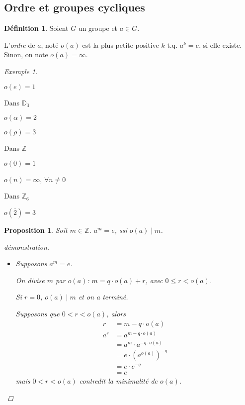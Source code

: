 \documentclass{report}
\newcommand*{\entiers}{\mathbb{Z}}
\newtheorem*{prop}{Proposition}
\theoremstyle{definition}
\newtheorem*{defin}{D\'efinition}
\theoremstyle{remark}
\newtheorem*{exem}{Exemple}
\begin{document}
	\subsection{Ordre et groupes cycliques}
	\begin{defin}
		Soient $G$ un groupe et $a \in G$.

		L'\emph{ordre} de $a$, not\'e $o(a)$ est la plus petite positive $k$ t.q. $a^k=e$, si elle existe. Sinon, on note $o(a) = \infty$.
	\end{defin}
	\begin{exem}~

		\begin{ulist}
			\item $o(e)=1$
			\item Dans $\mathbb{D}_3$
			\begin{ulist}
				\item $o(\alpha) = 2$
				\item $o(\rho) = 3$
			\end{ulist}
			\item Dans $\entiers$
			\begin{ulist}
				\item $o(0) = 1$
				\item $o(n) = \infty$, $\forall n\neq0$
			\end{ulist}
			\item Dans $\entiers_6$
			\begin{ulist}
				\item $o(\overline2) = 3$
			\end{ulist}
		\end{ulist}
	\end{exem}
	\begin{prop}
		Soit $m \in \entiers$. $a^m = e$, ssi $o(a) \mid m$.
		\begin{proof}[d\'emonstration]~

			\begin{itemize}
				\item[$(\Rightarrow)$] Supposons $a^m=e$.

				On divise $m$ par $o(a)$: $m = q \cdot o(a) + r$, avec $0 \leq r < o(a)$.

				Si $r=0$, $o(a) \mid m$ et on a termin\'e.

				Supposons que $0<r<o(a)$, alors
				\begin{align*}
					r&= m-q \cdot o(a)\\
					a^r&= a^{m-q \cdot o(a)}\\
					&= a^m \cdot a^{-q \cdot o(a)}\\
					&= e \cdot (a^{o(a)})^{-q}\\
					&= e \cdot e^{-q}\\
					&= e
				\end{align*}
				mais $0<r<o(a)$ contredit la minimalit\'e de $o(a)$.
			\end{itemize}
		\end{proof}
	\end{prop}
\end{document}

